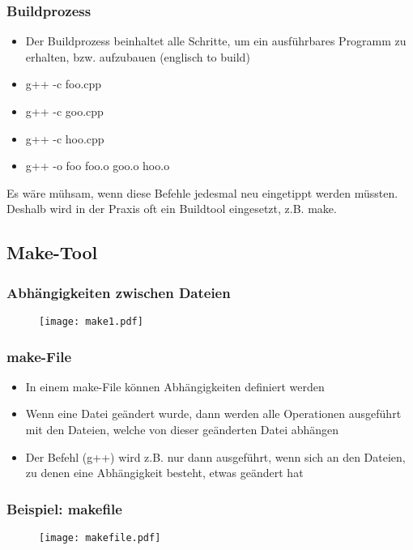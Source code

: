 \subsubsection{Buildprozess\hfill}
\label{sec:Buildprozess}
\begin{itemize}
	\item Der Buildprozess beinhaltet alle Schritte, um ein ausführbares Programm zu erhalten, bzw. aufzubauen (englisch to build)
	\item[\-] g++ -c foo.cpp
	\item[\-] g++ -c goo.cpp
	\item[\-] g++ -c hoo.cpp	
	\item[\-] g++ -o foo foo.o goo.o hoo.o
\end{itemize}
\begin{hinweis}
	Es wäre mühsam, wenn diese Befehle jedesmal neu eingetippt werden müssten. Deshalb wird in der Praxis oft ein Buildtool eingesetzt, z.B. make.
\end{hinweis}

\subsection{Make-Tool}
\label{sec:Makt-Tool}

\subsubsection{Abhängigkeiten zwischen Dateien}
\label{sec:Abhaengigkeiten zwischen Dateien}
\noindent
\begin{figure}[hh]
	\centering
	\texttt{[image: make1.pdf]}
\end{figure}

\subsubsection{make-File}
\label{sec:make-File}
\begin{itemize}
	\item In einem make-File können Abhängigkeiten definiert werden
	\item Wenn eine Datei geändert wurde, dann werden alle Operationen ausgeführt mit den Dateien, welche von dieser geänderten Datei abhängen
	\item Der Befehl (g++) wird z.B. nur dann ausgeführt, wenn sich an den Dateien, zu denen eine Abhängigkeit besteht, etwas geändert hat
\end{itemize}

\subsubsection{Beispiel: makefile}
\label{sec:Beispiel: makefile}
\noindent
\begin{figure}[hh]
	\centering
	\texttt{[image: makefile.pdf]}
\end{figure}